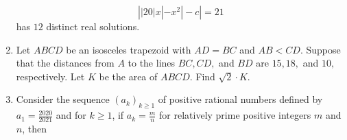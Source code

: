 \documentclass{article}
\begin{document}
\begin{enumerate}[label=\arabic*., itemsep=0.5em]
\begin{equation*}
\left||20|x|-x^2|-c\right|=21
\end{equation*}
has $12$ distinct real solutions.\par \vspace{0.5em}\item Let $ABCD$ be an isosceles trapezoid with $AD=BC$ and $AB<CD.$ Suppose that the distances from $A$ to the lines $BC,CD,$ and $BD$ are $15,18,$ and $10,$ respectively. Let $K$ be the area of $ABCD.$ Find $\sqrt2 \cdot K.$\par \vspace{0.5em}\item Consider the sequence $(a_k)_{k\ge 1}$ of positive rational numbers defined by $a_1 = \frac{2020}{2021}$ and for $k\ge 1$, if $a_k = \frac{m}{n}$ for relatively prime positive integers $m$ and $n$, then



\end{enumerate}
\end{document}
